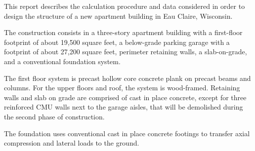 This report describes the calculation procedure and data considered in order to design the structure of a new apartment building in Eau Claire, Wisconsin.

The construction consists in a three-story apartment building with a first-floor footprint of about 19,500 square feet, a below-grade parking garage with a footprint of about 27,200 square feet, perimeter retaining walls, a slab-on-grade, and a conventional foundation system.

The first floor system is precast hollow core concrete plank on precast beams and columns. For the upper floors and roof, the system is wood-framed. Retaining walls and slab on grade are comprised of cast in place concrete, except for three reinforced CMU walls next to the garage aisles, that will be demolished during the second phase of construction.

The foundation uses conventional cast in place concrete footings to transfer axial compression and lateral loads to the ground.



